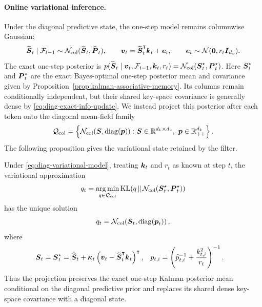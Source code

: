 \documentclass[11pt,letterpaper,logo]{yalearxiv}
\begin{document}
\paragraph{Online variational inference.}
Under the diagonal predictive state, the one-step model remains columnwise Gaussian:
\begin{equation}
  \widetilde{\boldsymbol{S}}_t\mid\mathcal{F}_{t-1}
  \sim\mathcal N_{\mathrm{col}}(\widehat{\boldsymbol{S}}_t,\widehat{\boldsymbol{P}}_t),
  \qquad
  \boldsymbol{v}_t=\widetilde{\boldsymbol{S}}_t^{\intercal}\boldsymbol{k}_t+\boldsymbol{e}_t,
  \qquad
  \boldsymbol{e}_t\sim\mathcal N(\boldsymbol{0},r_t\boldsymbol{I}_{d_v}).
  \label{eq:diag-variational-model}
\end{equation}
The exact one-step posterior is
$p(\widetilde{\boldsymbol{S}}_t\mid\boldsymbol{v}_t,\mathcal{F}_{t-1},\boldsymbol{k}_t,r_t)
=\mathcal N_{\mathrm{col}}(\boldsymbol{S}_t^\star,\boldsymbol{P}_t^\star)$.
Here $\boldsymbol{S}_t^\star$ and $\boldsymbol{P}_t^\star$ are the exact Bayes-optimal one-step posterior mean
and covariance given by Proposition~\ref{prop:kalman-associative-memory}.
Its columns remain conditionally independent, but their shared
key-space covariance is generally dense by \eqref{eq:diag-exact-info-update}. We instead project
this posterior after each token onto the diagonal mean-field family
\begin{equation}
  \mathcal{Q}_{\mathrm{col}}
  =\left\{
    \mathcal N_{\mathrm{col}}(\boldsymbol{S},\operatorname{diag}(\boldsymbol{p})):
    \boldsymbol{S}\in\mathbb{R}^{d_k\times d_v},\ \boldsymbol{p}\in\mathbb{R}_{++}^{d_k}
  \right\}.
  \label{eq:diag-variational-family}
\end{equation}
The following proposition gives the variational state retained by the filter.

\begin{proposition}
\label{prop:diag-variational-inference}
Under \eqref{eq:diag-variational-model}, treating $\boldsymbol{k}_t$ and $r_t$ as known at step $t$,
the variational approximation
\begin{equation}
  q_t
  =\operatorname*{arg\,min}_{q\in\mathcal{Q}_{\mathrm{col}}}
    \operatorname{KL}\!\left(
      q\,\|\,\mathcal N_{\mathrm{col}}(\boldsymbol{S}_t^\star,\boldsymbol{P}_t^\star)
    \right)
  \label{eq:diag-variational-objective}
\end{equation}
has the unique solution
\begin{equation}
  q_t
  =\mathcal N_{\mathrm{col}}\!\left(
      \boldsymbol{S}_t,\operatorname{diag}(\boldsymbol{p}_t)
    \right),
  \label{eq:diag-variational-posterior}
\end{equation}
where
\begin{equation}
\begin{aligned}
  \boldsymbol{S}_t
  &=\boldsymbol{S}_t^\star
    =\widehat{\boldsymbol{S}}_t
    +\boldsymbol{\kappa}_t
      \left(\boldsymbol{v}_t-\widehat{\boldsymbol{S}}_t^{\intercal}\boldsymbol{k}_t\right)^{\intercal},
  &
  p_{t,i}
  &=\left(\widehat p_{t,i}^{-1}+\frac{k_{t,i}^2}{r_t}\right)^{-1}.
\end{aligned}
  \label{eq:diag-variational-solution}
\end{equation}
Thus the projection preserves the exact one-step Kalman posterior mean conditional on the diagonal
predictive prior and replaces its shared dense key-space covariance with a diagonal state.
\end{proposition}
\end{document}
